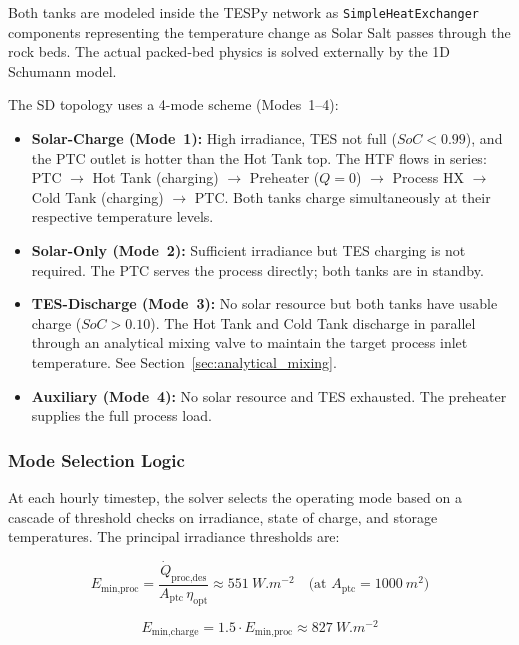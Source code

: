 \documentclass[11pt,review,3p]{elsarticle}
\begin{document}
Both tanks are modeled inside the TESPy network as \texttt{SimpleHeatExchanger} components representing the temperature change as Solar Salt passes through the rock beds. The actual packed-bed physics is solved externally by the 1D Schumann model.

The SD topology uses a 4-mode scheme (Modes~1--4):

\begin{itemize}[leftmargin=*, itemsep=4pt]
    \item \textbf{Solar-Charge (Mode~1):} High irradiance, TES not full ($SoC < 0.99$), and the PTC outlet is hotter than the Hot Tank top. The HTF flows in series: PTC $\to$ Hot Tank (charging) $\to$ Preheater ($Q=0$) $\to$ Process HX $\to$ Cold Tank (charging) $\to$ PTC. Both tanks charge simultaneously at their respective temperature levels.
    \item \textbf{Solar-Only (Mode~2):} Sufficient irradiance but TES charging is not required. The PTC serves the process directly; both tanks are in standby.
    \item \textbf{TES-Discharge (Mode~3):} No solar resource but both tanks have usable charge ($SoC > 0.10$). The Hot Tank and Cold Tank discharge in parallel through an analytical mixing valve to maintain the target process inlet temperature. See Section~\ref{sec:analytical_mixing}.
    \item \textbf{Auxiliary (Mode~4):} No solar resource and TES exhausted. The preheater supplies the full process load.
\end{itemize}

\subsubsection{Mode Selection Logic}
\label{sec:mode_selection}

At each hourly timestep, the solver selects the operating mode based on a cascade of threshold checks on irradiance, state of charge, and storage temperatures. The principal irradiance thresholds are:

\begin{equation}
    E_{\text{min,proc}} = \frac{\dot{Q}_{\text{proc,des}}}{A_{\text{ptc}}\,\eta_{\text{opt}}} \approx \SI{551}{W.m^{-2}} \quad \text{(at } A_{\text{ptc}}=\SI{1000}{m^2}\text{)}
    \label{eq:e_min_proc}
\end{equation}

\begin{equation}
    E_{\text{min,charge}} = 1.5 \cdot E_{\text{min,proc}} \approx \SI{827}{W.m^{-2}}
    \label{eq:e_min_charge}
\end{equation}
\end{document}
